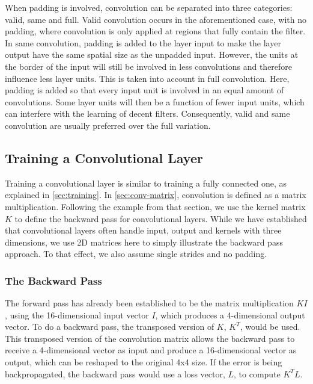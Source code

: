 \noindent When padding is involved, convolution can be separated into three categories: valid, same and full. Valid convolution occurs in the aforementioned case, with no padding, where convolution is only applied at regions that fully contain the filter. In same convolution, padding is added to the layer input to make the layer output have the same spatial size as the unpadded input. However, the units at the border of the input will still be involved in less convolutions and therefore influence less layer units. This is taken into account in full convolution. Here, padding is added so that every input unit is involved in an equal amount of convolutions. Some layer units will then be a function of fewer input units, which can interfere with the learning of decent filters. Consequently, valid and same convolution are usually preferred over the full variation.

\subsection{Training a Convolutional Layer}

Training a convolutional layer is similar to training a fully connected one, as explained in \autoref{sec:training}. In \autoref{sec:conv-matrix}, convolution is defined as a matrix multiplication. Following the example from that section, we use the kernel matrix $K$ to define the backward pass for convolutional layers. While we have established that convolutional layers often handle input, output and kernels with three dimensions, we use 2D matrices here to simply illustrate the backward pass approach. To that effect, we also assume single strides and no padding. 

\subsubsection{The Backward Pass}

The forward pass has already been established to be the matrix multiplication $KI$, using the 16-dimensional input vector $I$, which produces a 4-dimensional output vector. To do a backward pass, the transposed version of $K$, $K^T$, would be used. This transposed version of the convolution matrix allows the backward pass to receive a 4-dimensional vector as input and produce a 16-dimensional vector as output, which can be reshaped to the original 4x4 size. If the error is being backpropagated, the backward pass would use a loss vector, $L$, to compute $K^T L$. 

